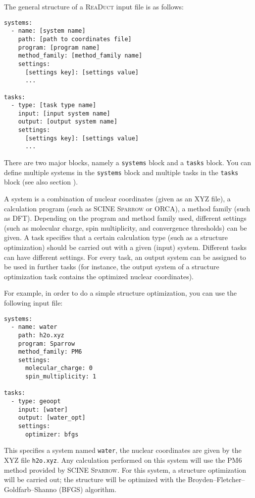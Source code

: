 \documentclass[]{tufte-book}
\begin{document}
The general structure of a \textsc{ReaDuct} input file is as follows:

\begin{verbatim}
systems:
  - name: [system name]
    path: [path to coordinates file]
    program: [program name]
    method_family: [method_family name]
    settings:
      [settings key]: [settings value]
      ...

tasks:
  - type: [task type name]
    input: [input system name]
    output: [output system name]
    settings:
      [settings key]: [settings value]
      ...

\end{verbatim}

There are two major blocks, namely a \texttt{systems} block and a \texttt{tasks} block. You can define multiple systems
in the \texttt{systems} block and multiple tasks in the \texttt{tasks} block (see also section ).

A system is a combination of nuclear coordinates (given as an XYZ file), a calculation program (such as SCINE \textsc{Sparrow}
or ORCA), a method family (such as DFT). Depending on the program and method family used,
different settings (such as molecular charge, spin multiplicity, and convergence thresholds) can be given.
A task specifies that a certain calculation type (such as a
structure optimization) should be carried out with a given (input) system. Different tasks can have different settings.
For every task, an output system can be assigned to be used in further tasks (for instance, the output system of a
structure optimization task contains the optimized nuclear coordinates).

For example, in order to do a simple structure optimization, you can use the following input file:

\begin{verbatim}
systems:
  - name: water
    path: h2o.xyz
    program: Sparrow
    method_family: PM6
    settings:
      molecular_charge: 0
      spin_multiplicity: 1

tasks:
  - type: geoopt
    input: [water]
    output: [water_opt]
    settings:
      optimizer: bfgs
\end{verbatim}

This specifies a system named \texttt{water}, the nuclear coordinates are given by the XYZ file \texttt{h2o.xyz}. Any
calculation performed on this system will use the PM6 method provided by SCINE \textsc{Sparrow}. For this system, a
structure optimization will be carried out; the structure will be optimized with the Broyden--Fletcher--Goldfarb--Shanno (BFGS) algorithm.
\end{document}

